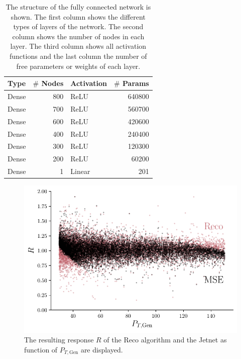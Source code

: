 \documentclass[12pt, a4paper]{thesis}
\begin{document}
\begin{table}[hbtp]
  \centering
  \begin{tabular}{lrlr}
    Type & \(\#\) Nodes & Activation & \(\#\) Params\\
    \hline
    Dense & 800 & ReLU & 640800\\
    Dense & 700 & ReLU & 560700\\
    Dense & 600 & ReLU & 420600\\
    Dense & 400 & ReLU & 240400\\
    Dense & 300 & ReLU & 120300\\
    Dense & 200 & ReLU & 60200\\
    Dense & 1 & Linear & 201\\
  \end{tabular}
  \caption{The structure of the fully connected network is shown. The
    first column shows the different types of layers of the
    network. The second column shows the number of nodes in each
    layer. The third column shows all activation functions and the
    last column the number of free parameters or weights of each
    layer.}
  \label{jet_fcn_structure}
\end{table}


\begin{figure}[hbtp]
  \centering
  \includegraphics[width=.9\linewidth]{../images/jetnet_R_scatter.pdf}
  \caption{The resulting response \(R\) of the Reco algorithm and the
    Jetnet as function of \(P_{T, \text{Gen}}\) are
    displayed. }
  \label{jetnet_R_scatter}
\end{figure}
\end{document}
